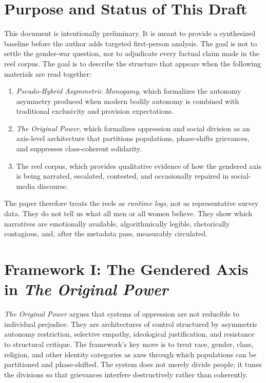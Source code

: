 \documentclass[12pt]{article}
\newcommand{\OP}{\textit{The Original Power}}
\newcommand{\PHAM}{\textit{Pseudo-Hybrid Asymmetric Monogamy}}
\begin{document}
\section{Purpose and Status of This Draft}

This document is intentionally preliminary. It is meant to provide a synthesized baseline before the author adds targeted first-person analysis. The goal is not to settle the gender-war question, nor to adjudicate every factual claim made in the reel corpus. The goal is to describe the structure that appears when the following materials are read together:

\begin{enumerate}
  \item \PHAM, which formalizes the autonomy asymmetry produced when modern bodily autonomy is combined with traditional exclusivity and provision expectations.
  \item \OP, which formalizes oppression and social division as an axis-level architecture that partitions populations, phase-shifts grievances, and suppresses class-coherent solidarity.
  \item The reel corpus, which provides qualitative evidence of how the gendered axis is being narrated, escalated, contested, and occasionally repaired in social-media discourse.
\end{enumerate}

The paper therefore treats the reels as \textit{runtime logs}, not as representative survey data. They do not tell us what all men or all women believe. They show which narratives are emotionally available, algorithmically legible, rhetorically contagious, and, after the metadata pass, measurably circulated.

\section{Framework I: The Gendered Axis in \OP}

\OP{} argues that systems of oppression are not reducible to individual prejudice. They are architectures of control structured by asymmetric autonomy restriction, selective empathy, ideological justification, and resistance to structural critique. The framework's key move is to treat race, gender, class, religion, and other identity categories as axes through which populations can be partitioned and phase-shifted. The system does not merely divide people; it tunes the divisions so that grievances interfere destructively rather than coherently.
\end{document}
